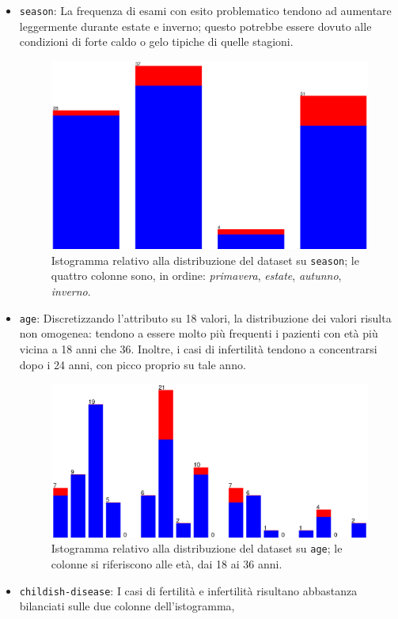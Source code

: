 \begin{itemize}
  \item \texttt{season}:
    La frequenza di esami con esito problematico tendono ad aumentare leggermente durante estate e inverno;
    questo potrebbe essere dovuto alle condizioni di forte caldo o gelo tipiche di quelle stagioni.
    \begin{figure}[H]
      \centering
      \includegraphics[width=.68\textwidth]{fig/season.eps}%
      \caption{%
        Istogramma relativo alla distribuzione del dataset su \texttt{season};
        le quattro colonne sono, in ordine: \emph{primavera}, \emph{estate}, \emph{autunno}, \emph{inverno}.
      }%
      \label{fig:season}
    \end{figure}
  \item \texttt{age}:
    Discretizzando l'attributo su 18 valori, la distribuzione dei valori risulta non omogenea:
    tendono a essere molto più frequenti i pazienti con età più vicina a 18 anni che 36.
    Inoltre, i casi di infertilità tendono a concentrarsi dopo i 24 anni, con picco proprio su tale anno.
    \begin{figure}[H]
      \centering
      \includegraphics[width=.68\textwidth]{fig/age-discrete.eps}%
      \caption{%
        Istogramma relativo alla distribuzione del dataset su \texttt{age};
        le colonne si riferiscono alle età, dai 18 ai 36 anni.
      }%
      \label{fig:age}
    \end{figure}
  \item \texttt{childish-disease}:
    I casi di fertilità e infertilità risultano abbastanza bilanciati sulle due colonne dell'istogramma,

\end{itemize}

